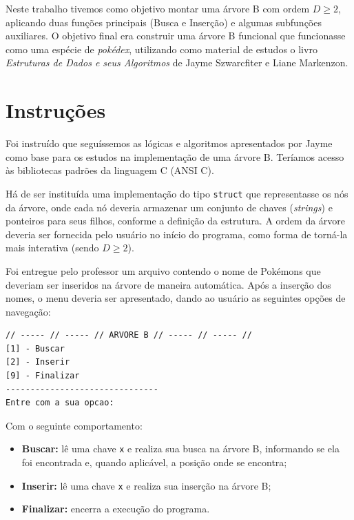 \documentclass[12pt,a4paper]{article}
\begin{document}
Neste trabalho tivemos como objetivo montar uma árvore B com ordem $D \geq 2$, aplicando duas funções principais (Busca e Inserção) e algumas subfunções auxiliares. O objetivo final era construir uma árvore B funcional que funcionasse como uma espécie de \textit{pokédex}, utilizando como material de estudos o livro \textit{Estruturas de Dados e seus Algoritmos} de Jayme Szwarcfiter e Liane Markenzon.

\section{Instruções}

Foi instruído que seguíssemos as lógicas e algoritmos apresentados por Jayme como base para os estudos na implementação de uma árvore B. Teríamos acesso às bibliotecas padrões da linguagem C (ANSI C).

Há de ser instituída uma implementação do tipo \texttt{struct} que representasse os nós da árvore, onde cada nó deveria armazenar um conjunto de chaves (\textit{strings}) e ponteiros para seus filhos, conforme a definição da estrutura. A ordem da árvore deveria ser fornecida pelo usuário no início do programa, como forma de torná-la mais interativa (sendo $D \geq 2$).

Foi entregue pelo professor um arquivo contendo o nome de Pokémons que deveriam ser inseridos na árvore de maneira automática. Após a inserção dos nomes, o menu deveria ser apresentado, dando ao usuário as seguintes opções de navegação:

\begin{lstlisting}[language={}, numbers=none, backgroundcolor=\color{backcolour}]
// ----- // ----- // ARVORE B // ----- // ----- //
[1] - Buscar
[2] - Inserir
[9] - Finalizar
-------------------------------
Entre com a sua opcao:
\end{lstlisting}

Com o seguinte comportamento:

\begin{itemize}
    \item \textbf{Buscar:} lê uma chave \texttt{x} e realiza sua busca na árvore B, informando se ela foi encontrada e, quando aplicável, a posição onde se encontra;
    \item \textbf{Inserir:} lê uma chave \texttt{x} e realiza sua inserção na árvore B;
    \item \textbf{Finalizar:} encerra a execução do programa.
\end{itemize}
\end{document}
